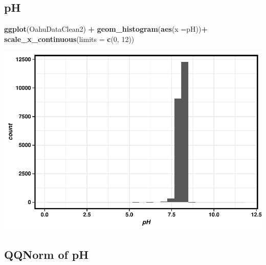 \documentclass[12pt,]{article}
\newenvironment{Shaded}{\begin{snugshade}}{\end{snugshade}}
\newcommand{\KeywordTok}[1]{\textcolor[rgb]{0.13,0.29,0.53}{\textbf{#1}}}
\newcommand{\DataTypeTok}[1]{\textcolor[rgb]{0.13,0.29,0.53}{#1}}
\newcommand{\DecValTok}[1]{\textcolor[rgb]{0.00,0.00,0.81}{#1}}
\newcommand{\StringTok}[1]{\textcolor[rgb]{0.31,0.60,0.02}{#1}}
\newcommand{\OperatorTok}[1]{\textcolor[rgb]{0.81,0.36,0.00}{\textbf{#1}}}
\newcommand{\NormalTok}[1]{#1}
\begin{document}
\subsection{pH}\label{ph}

\begin{Shaded}
\begin{Highlighting}[]
\KeywordTok{ggplot}\NormalTok{(OahuDataClean2) }\OperatorTok{+}
\StringTok{  }\KeywordTok{geom_histogram}\NormalTok{(}\KeywordTok{aes}\NormalTok{(}\DataTypeTok{x =}\NormalTok{pH))}\OperatorTok{+}
\StringTok{   }\KeywordTok{scale_x_continuous}\NormalTok{(}\DataTypeTok{limits =} \KeywordTok{c}\NormalTok{(}\DecValTok{0}\NormalTok{, }\DecValTok{12}\NormalTok{))}
\end{Highlighting}
\end{Shaded}

\includegraphics{Garcia_ENV872_Project_files/figure-latex/unnamed-chunk-27-1.pdf}

\subsection{QQNorm of pH}\label{qqnorm-of-ph}

\begin{Shaded}
\end{Shaded}
\end{document}
